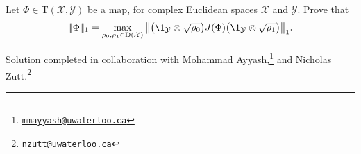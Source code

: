 \documentclass[boxes,pages,color=SeaGreen]{homework}
\newcommand{\collab}[1]{\footnote{\href{mailto:#1}{\texttt{#1}}}}
\newcommand{\X}{\mathcal{X}}
\newcommand{\Y}{\mathcal{Y}}
\newcommand{\Trans}{\mathrm{T}}
\newcommand{\Density}{\mathrm{D}}
\newcommand{\triplenorm}[1]{
  \lvert\!\lvert\!\lvert #1 
  \rvert\!\rvert\!\rvert}
\begin{document}

\begin{problem}
Let $\Phi\in\Trans(\X,\Y)$ be a map, for complex Euclidean spaces $\X$ and
$\Y$.
Prove that
\[
    \triplenorm{\Phi}_1 =
    \max_{\rho_0,\rho_1\in\Density(\X)}
    \norm{
        \qty\big( \1_{\Y} \otimes \sqrt{\rho_0} ) J(\Phi)
        \qty\big( \1_{\Y} \otimes \sqrt{\rho_1} )}_1.
\]
\end{problem}

\noindent Solution completed in collaboration with Mohammad Ayyash,\collab{mmayyash@uwaterloo.ca} and Nicholas Zutt.\collab{nzutt@uwaterloo.ca}

{\noindent\color{SeaGreen!30}\rule{\textwidth}{1.5pt}}

\begin{solution}

\end{solution}
\end{document}

